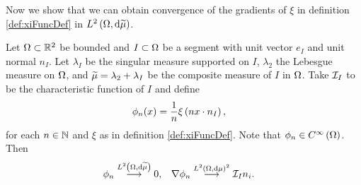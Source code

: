 \documentclass[11pt]{report}
\begin{document}
Now we show that we can obtain convergence of the gradients of $\xi$ in definition \ref{def:xiFuncDef} in $L^{2}\left( \Omega,\mathrm{d}\widetilde{\mu} \right)$.
\begin{lemma} \label{lem:SmoothFuncConvCharFuncCompositeMeasure}
	Let $\Omega\subset\mathbb{R}^2$ be bounded and $I\subset\Omega$ be a segment with unit vector $e_I$ and unit normal $n_I$.
	Let $\lambda_I$ be the singular measure supported on $I$, $\lambda_2$ the Lebesgue measure on $\Omega$, and $\widetilde{\mu} = \lambda_2 + \lambda_I$ be the composite measure of $I$ in $\Omega$.
	Take $\mathcal{I}_{I}$ to be the characteristic function of $I$ and define
	\begin{align*}
		\phi_n(x) &= \frac{1}{n}\xi\left( n x\cdot n_I \right),
	\end{align*}
	for each $n\in\mathbb{N}$ and $\xi$ as in definition \ref{def:xiFuncDef}.
	Note that $\phi_n\in C^{\infty}\left( \Omega \right)$.
	Then
	\begin{align*}
		\phi_n \overset{L^{2}\left( \Omega,\mathrm{d}\widetilde{\mu} \right)}{\longrightarrow} 0, &\quad
		\nabla\phi_n \overset{L^{2}\left( \Omega,\mathrm{d}\mu \right)^2}{\longrightarrow} \mathcal{I}_{I}n_i.
	\end{align*}
\end{lemma}
\end{document}

